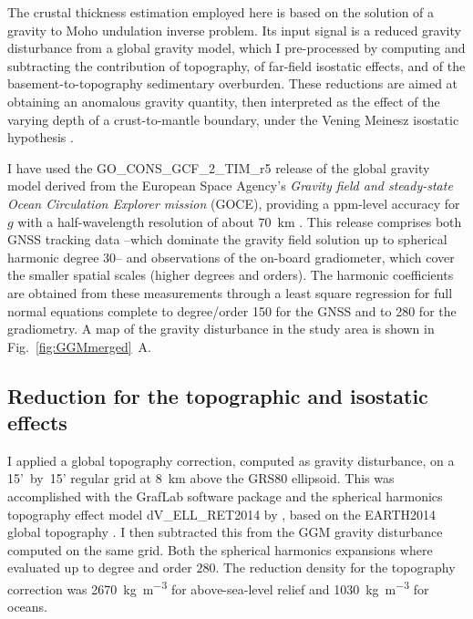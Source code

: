 The crustal thickness estimation employed here is based on the solution of a gravity to Moho undulation inverse problem.
Its input signal is a reduced gravity disturbance from a global gravity model, which I pre-processed by computing and subtracting the contribution of topography, of far-field isostatic effects, and of the basement-to-topography sedimentary overburden.
These reductions are aimed at obtaining an anomalous gravity quantity, then interpreted as the effect of the varying depth of a crust-to-mantle boundary, under the Vening Meinesz isostatic hypothesis \parencite{VeningMeinesz1931}.

I have used the {GO\_CONS\_GCF\_2\_TIM\_r5} release \parencites{Brockmann2014}{Pail2011GOCE}{GOCETIMr5datasheet} of the global gravity model derived from the European Space Agency's \textit{Gravity field and steady-state Ocean Circulation Explorer mission} (GOCE), providing a ppm-level accuracy for $g$ with a half-wavelength resolution of about 70~\si{\kilo \metre} \parencite{Floberghagen2011_goce}.
This release comprises both GNSS tracking data --which dominate the gravity field solution up to spherical harmonic degree 30-- and observations of the on-board gradiometer, which cover the smaller spatial scales (higher degrees and orders).
The harmonic coefficients are obtained from these measurements through a least square regression for full normal equations complete to degree/order 150 for the GNSS and to 280 for the gradiometry.
A map of the gravity disturbance in the study area is shown in Fig.~\ref{fig:GGMmerged}~A.

\subsection{Reduction for the topographic and isostatic effects}
\label{ss:Appl:GravTopoIso}
I applied a global topography correction, computed as gravity disturbance, on a 15'~by~15' regular grid at 8~\si{\kilo \metre} above the GRS80 ellipsoid.
This was accomplished with the GrafLab software package \parencites{bucha2013GrafLab} and the spherical harmonics topography effect model {dV\_ELL\_RET2014} by \textcite{Rexer2016}, based on the {EARTH2014} global topography \parencite{Hirt2015}.
I then subtracted this from the GGM gravity disturbance computed on the same grid.
Both the spherical harmonics expansions where evaluated up to degree and order $280$.
The reduction density for the topography correction was 2670~\si{\kilo \gram \per \cubic \metre} for above-sea-level relief and 1030~\si{\kilo \gram \per \cubic \metre} for oceans.

